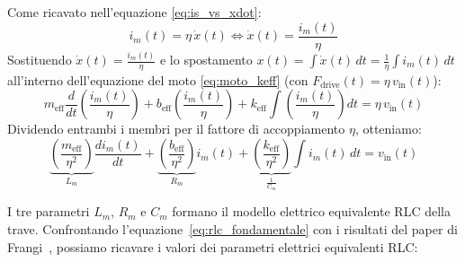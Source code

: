 \documentclass[11pt,a4paper]{article}
\begin{document}
\noindent Come ricavato nell'equazione \eqref{eq:is_vs_xdot}:
\begin{equation}
    i_m(t) = \eta \, \dot{x}(t) \iff \dot{x}(t) = \frac{i_m(t)}{\eta}
\end{equation}
Sostituendo $\dot{x}(t) = \frac{i_m(t)}{\eta}$ e lo spostamento $x(t) = \int \dot{x}(t) \, dt = \frac{1}{\eta} \int i_m(t) \, dt$ all'interno dell'equazione del moto \eqref{eq:moto_keff} (con $F_{\text{drive}}(t) = \eta \, v_{\text{in}}(t)$):
\begin{equation}
    m_{\text{eff}} \frac{d}{dt}\left( \frac{i_m(t)}{\eta} \right) + b_{\text{eff}} \left( \frac{i_m(t)}{\eta} \right) + k_{\text{eff}} \int \left( \frac{i_m(t)}{\eta} \right) dt = \eta \, v_{\text{in}}(t)
\end{equation}
Dividendo entrambi i membri per il fattore di accoppiamento $\eta$, otteniamo:
\begin{equation}
    \label{eq:rlc_fondamentale}
    \underbrace{\left(\frac{m_{\text{eff}}}{\eta^2}\right)}_{L_m} \frac{di_m(t)}{dt} + \underbrace{\left(\frac{b_{\text{eff}}}{\eta^2}\right)}_{R_m} i_m(t) + \underbrace{\left(\frac{k_{\text{eff}}}{\eta^2}\right)}_{\frac{1}{C_m}} \int i_m(t) \, dt = v_{\text{in}}(t)
\end{equation}

\noindent I tre parametri $L_m$, $R_m$ e $C_m$ formano il modello elettrico equivalente RLC della trave. Confrontando l'equazione~\eqref{eq:rlc_fondamentale} con i risultati del paper di Frangi~\cite{frangi2023}, possiamo ricavare i valori dei parametri elettrici equivalenti RLC:
\end{document}
